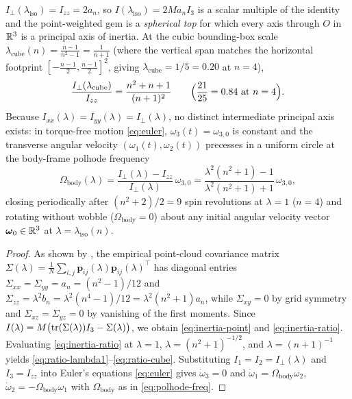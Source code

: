 \begin{theorem}
\begin{equation}
\end{equation}
$I_\perp(\lambda_{\mathrm{iso}})=I_{zz}=2a_n$, so $I(\lambda_{\mathrm{iso}})=2Ma_nI_3$ is a scalar multiple of the identity and the point-weighted gem is a \emph{spherical top} for which every axis through $O$ in $\mathbb{R}^3$ is a principal axis of inertia. At the cubic bounding-box scale $\lambda_{\mathrm{cube}}(n)=\frac{n-1}{n^2-1}=\frac{1}{n+1}$ (where the vertical span matches the horizontal footprint $[-\frac{n-1}{2},\frac{n-1}{2}]^2$, giving $\lambda_{\mathrm{cube}}=1/5=0.20$ at $n=4$),
\begin{equation}
\label{eq:ratio-cube}
\frac{I_\perp(\lambda_{\mathrm{cube}})}{I_{zz}} = \frac{n^2+n+1}{(n+1)^2}
\qquad\Bigl(\frac{21}{25}=0.84\text{ at }n=4\Bigr).
\end{equation}
Because $I_{xx}(\lambda)=I_{yy}(\lambda)=I_\perp(\lambda)$, no distinct intermediate principal axis exists: in torque-free motion \eqref{eq:euler}, $\omega_3(t)=\omega_{3,0}$ is constant and the transverse angular velocity $(\omega_1(t),\omega_2(t))$ precesses in a uniform circle at the body-frame polhode frequency
\begin{equation}
\label{eq:polhode-freq}
\Omega_{\mathrm{body}}(\lambda) = \frac{I_\perp(\lambda)-I_{zz}}{I_\perp(\lambda)}\,\omega_{3,0}
= \frac{\lambda^2(n^2+1)-1}{\lambda^2(n^2+1)+1}\,\omega_{3,0},
\end{equation}
closing periodically after $(n^2+2)/2=9$ spin revolutions at $\lambda=1$ ($n=4$) and rotating without wobble ($\Omega_{\mathrm{body}}=0$) about any initial angular velocity vector $\boldsymbol\omega_0\in\mathbb{R}^3$ at $\lambda=\lambda_{\mathrm{iso}}(n)$.
\end{theorem}

\begin{proof}
As shown by \citet{mathewson2026gems}, the empirical point-cloud covariance matrix $\Sigma(\lambda)=\frac1N\sum_{i,j}\mathbf p_{ij}(\lambda)\mathbf p_{ij}(\lambda)^{\top}$ has diagonal entries $\Sigma_{xx}=\Sigma_{yy}=a_n=(n^2-1)/12$ and $\Sigma_{zz}=\lambda^2b_n=\lambda^2(n^4-1)/12=\lambda^2(n^2+1)a_n$, while $\Sigma_{xy}=0$ by grid symmetry and $\Sigma_{xz}=\Sigma_{yz}=0$ by vanishing of the first moments. Since $I(\lambda)=M\bigl(\operatorname{tr}(\Sigma(\lambda))I_3-\Sigma(\lambda)\bigr)$, we obtain \eqref{eq:inertia-point} and \eqref{eq:inertia-ratio}. Evaluating \eqref{eq:inertia-ratio} at $\lambda=1$, $\lambda=(n^2+1)^{-1/2}$, and $\lambda=(n+1)^{-1}$ yields \eqref{eq:ratio-lambda1}--\eqref{eq:ratio-cube}. Substituting $I_1=I_2=I_\perp(\lambda)$ and $I_3=I_{zz}$ into Euler's equations \eqref{eq:euler} gives $\dot\omega_3=0$ and $\dot\omega_1=\Omega_{\mathrm{body}}\omega_2$, $\dot\omega_2=-\Omega_{\mathrm{body}}\omega_1$ with $\Omega_{\mathrm{body}}$ as in \eqref{eq:polhode-freq}.
\end{proof}

